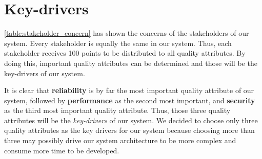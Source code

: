 \section{Key-drivers}

\autoref{table:stakeholder_concern} has shown the concerns of the stakeholders of our system. Every stakeholder is equally the same in our system. Thus, each stakeholder receives 100 points to be distributed to all quality attributes. By doing this, important quality attributes can be determined and those will be the key-drivers of our system.

It is clear that \textbf{reliability} is by far the most important quality attribute of our system, followed by \textbf{performance} as the second most important, and \textbf{security} as the third most important quality attribute. Thus, those three quality attributes will be the \textit{key-drivers} of our system. We decided to choose only three quality attributes as the key drivers for our system because choosing more than three may possibly drive our system architecture to be more complex and consume more time to be developed.
